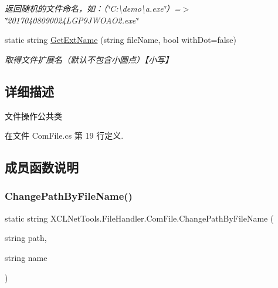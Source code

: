 \begin{DoxyCompactItemize}
\begin{DoxyCompactList}\small\item\em 返回随机的文件命名，如：（\char`\"{}\+C\+:\textbackslash{}demo\textbackslash{}a.\+exe\char`\"{}）=$>$\char`\"{}20170408090024\+L\+G\+P9\+J\+W\+O\+A\+O2.\+exe\char`\"{} \end{DoxyCompactList}\item 
static string \hyperlink{class_x_c_l_net_tools_1_1_file_handler_1_1_com_file_aea15d94b71b88fe32adf37411867a451}{Get\+Ext\+Name} (string file\+Name, bool with\+Dot=false)
\begin{DoxyCompactList}\small\item\em 取得文件扩展名（默认不包含小圆点）【小写】 \end{DoxyCompactList}\end{DoxyCompactItemize}


\subsection{详细描述}
文件操作公共类 



在文件 Com\+File.\+cs 第 19 行定义.



\subsection{成员函数说明}
\mbox{\label{class_x_c_l_net_tools_1_1_file_handler_1_1_com_file_a738457a4d0f779375830827f460da5ce}} 
\subsubsection{\texorpdfstring{Change\+Path\+By\+File\+Name()}{ChangePathByFileName()}}
{\footnotesize\ttfamily static string X\+C\+L\+Net\+Tools.\+File\+Handler.\+Com\+File.\+Change\+Path\+By\+File\+Name (\begin{DoxyParamCaption}\item[{string}]{path,  }\item[{string}]{name }\end{DoxyParamCaption})\hspace{0.3cm}{\ttfamily [static]}}



